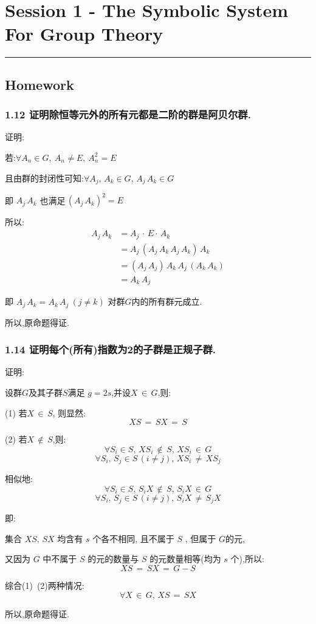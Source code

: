 \section{Session 1 - The Symbolic System For Group Theory}
\vspace{-15pt}\noindent\rule{\textwidth}{0.1pt}\vspace{-10pt}
    \subsection{Homework}
    \subsubsection{1.12 \textnormal{证明除恒等元外的所有元都是二阶的群是阿贝尔群}.}
    {\color{hwSolution}
    \noindent 证明:

        若:$\forall A_n \in G ,~A_n \neq E ,~A_n^2 = E$

        且由群的封闭性可知:$\forall A_j,\,A_k \in G,\,A_j\,A_k \in G$
        
        即 $A_j\,A_k$ 也满足\,$\left(A_j\,A_k\right)^2 = E$

        所以:
        \begin{align*}
            A_j\,A_k    &= A_j\,\cdot\,E\cdot\,A_k\\
                        &= A_j\,\left(A_j\,A_k\,A_j\,A_k\right)\,A_k\\
                        &= \left(A_j\,A_j\right)\,A_k\,A_j\,\left(A_k\,A_k\right)\\
                        &= A_k\,A_j
        \end{align*}

        即 $A_j\,A_k = A_k\,A_j~(j\neq k)$ 对群$G$内的所有群元成立.

        所以,原命题得证.
    }

    \subsubsection{1.14 \textnormal{证明每个(所有)指数为2的子群是正规子群}.}
    {\color{hwSolution}
    \noindent 证明:

        设群$G$及其子群$S$满足 $g = 2s$,并设$X\,\in\,G$,则:

        (1) 若$X\,\in\,S$, 则显然:
        \[ XS\,=\,SX\,=\,S \]

        (2) 若$X\,\notin\,S$,则:
        \[\forall S_i \in S,\,XS_i\,\notin\,S,\,XS_i\,\in\,G\]
        \[\forall S_i,\,S_j \in S\,(i\neq j),\,XS_i\,\neq\,XS_j\]

        相似地:
        \[\forall S_i \in S,\,S_iX\,\notin\,S,\,S_iX\,\in\,G\]
        \[\forall S_i,\,S_j \in S\,(i\neq j),\,S_iX\,\neq\,S_jX\]

        即:
        
        集合 $XS,\,SX$ 均含有 $s$ 个各不相同, 且不属于 $S$ , 但属于 $G$的元,
        
        又因为 $G$ 中不属于 $S$ 的元的数量与 $S$ 的元数量相等(均为 $s$ 个),所以:
        \[ XS\,=\,SX\,=\,G-S \]

        综合(1)~(2)两种情况: 
        \[~\forall X\,\in\,G,\,XS\,=\,SX~\]

        所以,原命题得证.
    }

